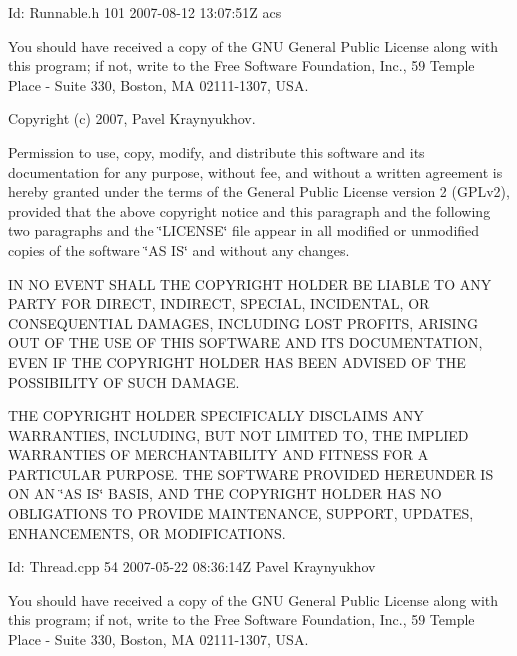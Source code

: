 \begin{DoxyParagraph}{Id\-:}
Runnable.\-h 101 2007-\/08-\/12 13\-:07\-:51\-Z acs 
\end{DoxyParagraph}


You should have received a copy of the G\-N\-U General Public License along with this program; if not, write to the Free Software Foundation, Inc., 59 Temple Place -\/ Suite 330, Boston, M\-A 02111-\/1307, U\-S\-A.

Copyright (c) 2007, Pavel Kraynyukhov.

Permission to use, copy, modify, and distribute this software and its documentation for any purpose, without fee, and without a written agreement is hereby granted under the terms of the General Public License version 2 (G\-P\-Lv2), provided that the above copyright notice and this paragraph and the following two paragraphs and the \char`\"{}\-L\-I\-C\-E\-N\-S\-E\char`\"{} file appear in all modified or unmodified copies of the software \char`\"{}\-A\-S I\-S\char`\"{} and without any changes.

I\-N N\-O E\-V\-E\-N\-T S\-H\-A\-L\-L T\-H\-E C\-O\-P\-Y\-R\-I\-G\-H\-T H\-O\-L\-D\-E\-R B\-E L\-I\-A\-B\-L\-E T\-O A\-N\-Y P\-A\-R\-T\-Y F\-O\-R D\-I\-R\-E\-C\-T, I\-N\-D\-I\-R\-E\-C\-T, S\-P\-E\-C\-I\-A\-L, I\-N\-C\-I\-D\-E\-N\-T\-A\-L, O\-R C\-O\-N\-S\-E\-Q\-U\-E\-N\-T\-I\-A\-L D\-A\-M\-A\-G\-E\-S, I\-N\-C\-L\-U\-D\-I\-N\-G L\-O\-S\-T P\-R\-O\-F\-I\-T\-S, A\-R\-I\-S\-I\-N\-G O\-U\-T O\-F T\-H\-E U\-S\-E O\-F T\-H\-I\-S S\-O\-F\-T\-W\-A\-R\-E A\-N\-D I\-T\-S D\-O\-C\-U\-M\-E\-N\-T\-A\-T\-I\-O\-N, E\-V\-E\-N I\-F T\-H\-E C\-O\-P\-Y\-R\-I\-G\-H\-T H\-O\-L\-D\-E\-R H\-A\-S B\-E\-E\-N A\-D\-V\-I\-S\-E\-D O\-F T\-H\-E P\-O\-S\-S\-I\-B\-I\-L\-I\-T\-Y O\-F S\-U\-C\-H D\-A\-M\-A\-G\-E.

T\-H\-E C\-O\-P\-Y\-R\-I\-G\-H\-T H\-O\-L\-D\-E\-R S\-P\-E\-C\-I\-F\-I\-C\-A\-L\-L\-Y D\-I\-S\-C\-L\-A\-I\-M\-S A\-N\-Y W\-A\-R\-R\-A\-N\-T\-I\-E\-S, I\-N\-C\-L\-U\-D\-I\-N\-G, B\-U\-T N\-O\-T L\-I\-M\-I\-T\-E\-D T\-O, T\-H\-E I\-M\-P\-L\-I\-E\-D W\-A\-R\-R\-A\-N\-T\-I\-E\-S O\-F M\-E\-R\-C\-H\-A\-N\-T\-A\-B\-I\-L\-I\-T\-Y A\-N\-D F\-I\-T\-N\-E\-S\-S F\-O\-R A P\-A\-R\-T\-I\-C\-U\-L\-A\-R P\-U\-R\-P\-O\-S\-E. T\-H\-E S\-O\-F\-T\-W\-A\-R\-E P\-R\-O\-V\-I\-D\-E\-D H\-E\-R\-E\-U\-N\-D\-E\-R I\-S O\-N A\-N \char`\"{}\-A\-S I\-S\char`\"{} B\-A\-S\-I\-S, A\-N\-D T\-H\-E C\-O\-P\-Y\-R\-I\-G\-H\-T H\-O\-L\-D\-E\-R H\-A\-S N\-O O\-B\-L\-I\-G\-A\-T\-I\-O\-N\-S T\-O P\-R\-O\-V\-I\-D\-E M\-A\-I\-N\-T\-E\-N\-A\-N\-C\-E, S\-U\-P\-P\-O\-R\-T, U\-P\-D\-A\-T\-E\-S, E\-N\-H\-A\-N\-C\-E\-M\-E\-N\-T\-S, O\-R M\-O\-D\-I\-F\-I\-C\-A\-T\-I\-O\-N\-S.

\begin{DoxyParagraph}{Id\-:}
Thread.\-cpp 54 2007-\/05-\/22 08\-:36\-:14\-Z Pavel Kraynyukhov 
\end{DoxyParagraph}


You should have received a copy of the G\-N\-U General Public License along with this program; if not, write to the Free Software Foundation, Inc., 59 Temple Place -\/ Suite 330, Boston, M\-A 02111-\/1307, U\-S\-A. 